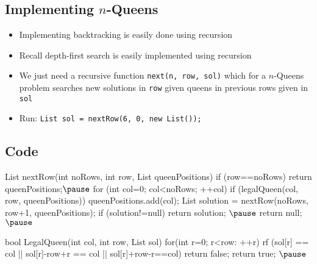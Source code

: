 
\begin{slide}
\section{Implementing $n$-Queens}

\begin{PauseHighLight}
  \begin{itemize}
  \item Implementing backtracking is easily done using recursion\pause
  \item Recall depth-first search is easily implemented using
    recursion\pause
  \item We just need a recursive function \texttt{next(n, row, sol)}
    which for a $n$-Queens problem searches new solutions in
    \texttt{row} given queens in previous rows given in
    \texttt{sol}\pause
  \item Run: \texttt{List sol = nextRow(6, 0, new List());}\pause
  \end{itemize}
\end{PauseHighLight}

\end{slide}


\begin{slide}
\section[-1]{Code}

\begin{java}
List nextRow(int noRows, int row, List queenPositions) {
  if (row==noRows) {return queenPositions;}$\pause$
  for (int col=0; col<noRows; ++col) {
    if (legalQueen(col, row, queenPositions)) {
      queenPositions.add(col);
      List solution = nextRow(noRows, row+1, queenPositions);
      if (solution!=null)
	return solution;
    }$\pause$
  }
  return null;
}$\pause$

bool LegalQueen(int col, int row, List sol) {
  for(int r=0; r<row: ++r) {
    rf (sol[r] == col || sol[r]-row+r == col || sol[r]+row-r==col) {
      return false;
    }
  }
  return true;
}$\pause$
\end{java}

\end{slide}



